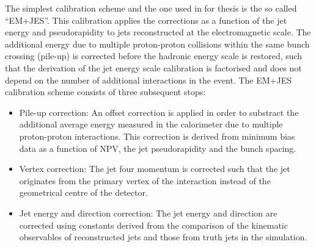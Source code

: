 The simplest calibration scheme and the one used in for thesis is the so called ``EM+JES''. This calibration applies the corrections as a function of the jet energy and pseudorapidity to jets reconstructed at the electromagnetic scale.  The additional energy due to multiple proton-proton collisions within the same bunch crossing (pile-up) is corrected before the hadronic energy scale is restored, such that the derivation of the jet energy scale calibration is factorised and does not depend on the number of additional interactions in the event. The EM+JES calibration scheme consists of three subsequent stops:

\begin{itemize}
\item
Pile-up correction: An offset correction is applied in order to substract the additional average energy measured in the calorimeter due to multiple proton-proton interactions. This correction is derived from minimum bias data as a function of NPV, the jet pseudorapidity and the bunch spacing.
\item
Vertex correction: The jet four momentum is corrected such that the jet originates from the primary vertex of the interaction instead of the geometrical centre of the detector. 
\item
Jet energy and direction correction: The jet energy and direction are corrected using constants derived from the comparison of the kinematic observables of reconstructed jets and those from truth jets in the simulation.


\end{itemize}
